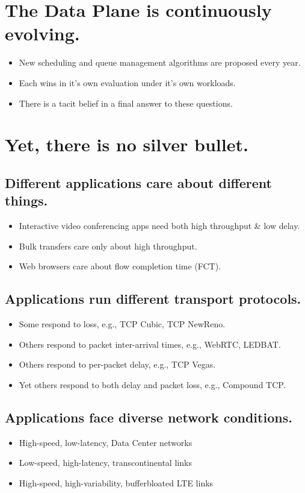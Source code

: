 {\large \bf
\begin{multicols}{2}
\section*{The Data Plane is continuously evolving.}
\begin{itemize}
\item New scheduling and queue management algorithms are proposed every year.
\item Each wins in it's own evaluation under it's own workloads.
\item There is a tacit belief in a final answer to these questions.
\end{itemize}

\section*{Yet, there is no silver bullet.}
\subsection*{Different applications care about different things.}
\begin{itemize}
\item Interactive video conferencing apps need both high throughput \& low delay.
\item Bulk transfers care only about high throughput.
\item Web browsers care about flow completion time (FCT).
\end{itemize}

\subsection*{Applications run different transport protocols.}
\begin{itemize}
\item Some respond to loss, e.g., TCP Cubic, TCP NewReno.
\item Others respond to packet inter-arrival times, e.g., WebRTC, LEDBAT.
\item Others respond to per-packet delay, e.g., TCP Vegas.
\item Yet others respond to both delay and packet loss, e.g., Compound TCP.
\end{itemize}

\subsection*{Applications face diverse network conditions.}
\begin{itemize}
\item High-speed, low-latency, Data Center networks
\item Low-speed, high-latency, transcontinental links
\item High-speed, high-variability, bufferbloated LTE links
\end{itemize}


\end{multicols}}
